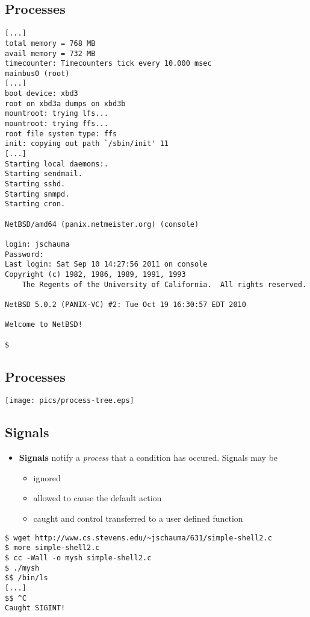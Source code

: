 \documentclass[xga]{xdvislides}
\begin{document}
\subsection{Processes}
\small
\begin{verbatim}
[...]
total memory = 768 MB
avail memory = 732 MB
timecounter: Timecounters tick every 10.000 msec
mainbus0 (root)
[...]
boot device: xbd3
root on xbd3a dumps on xbd3b
mountroot: trying lfs...
mountroot: trying ffs...
root file system type: ffs
init: copying out path `/sbin/init' 11
[...]
Starting local daemons:.
Starting sendmail.
Starting sshd.
Starting snmpd.
Starting cron.

NetBSD/amd64 (panix.netmeister.org) (console)

login: jschauma
Password:
Last login: Sat Sep 10 14:27:56 2011 on console
Copyright (c) 1982, 1986, 1989, 1991, 1993
    The Regents of the University of California.  All rights reserved.

NetBSD 5.0.2 (PANIX-VC) #2: Tue Oct 19 16:30:57 EDT 2010

Welcome to NetBSD!

$
\end{verbatim}
\Normalsize



\subsection{Processes}
\begin{center}
\texttt{[image: pics/process-tree.eps]} \\
\end{center}

\subsection{Signals}
\begin{itemize}
	\item	{\bf Signals} notify a {\em process} that a condition
			has occured. Signals may be
		\begin{itemize}
			\item ignored
			\item allowed to cause the default action
			\item caught and control transferred to a user defined function
		\end{itemize}
\end{itemize}
\vspace*{\fill}
\begin{center}
\begin{verbatim}
$ wget http://www.cs.stevens.edu/~jschauma/631/simple-shell2.c
$ more simple-shell2.c
$ cc -Wall -o mysh simple-shell2.c
$ ./mysh
$$ /bin/ls
[...]
$$ ^C
Caught SIGINT!
\end{verbatim}
\end{center}
\vspace*{\fill}
\end{document}
